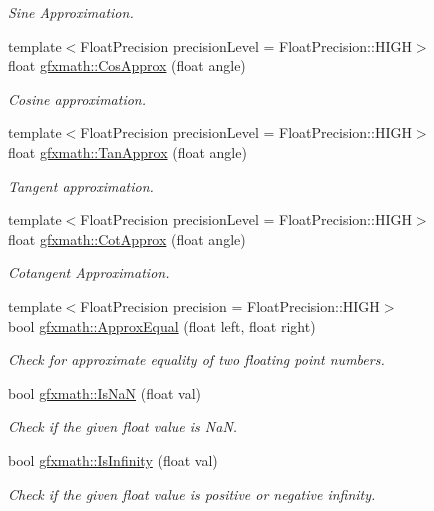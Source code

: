 \begin{DoxyCompactItemize}
\begin{DoxyCompactList}\small\item\em Sine Approximation. \end{DoxyCompactList}\item 
{\footnotesize template$<$Float\+Precision precision\+Level = Float\+Precision\+::\+H\+I\+G\+H$>$ }\\float \hyperlink{group___s_i_s_d_scalar_math_ga4c7f22bb5c746703d834991b074e2721}{gfxmath\+::\+Cos\+Approx} (float angle)
\begin{DoxyCompactList}\small\item\em Cosine approximation. \end{DoxyCompactList}\item 
{\footnotesize template$<$Float\+Precision precision\+Level = Float\+Precision\+::\+H\+I\+G\+H$>$ }\\float \hyperlink{group___s_i_s_d_scalar_math_gac117306c04c7d0b931c3b2b4eb4fd6ae}{gfxmath\+::\+Tan\+Approx} (float angle)
\begin{DoxyCompactList}\small\item\em Tangent approximation. \end{DoxyCompactList}\item 
{\footnotesize template$<$Float\+Precision precision\+Level = Float\+Precision\+::\+H\+I\+G\+H$>$ }\\float \hyperlink{group___s_i_s_d_scalar_math_ga6914719e1538a2c1d58828197bc76041}{gfxmath\+::\+Cot\+Approx} (float angle)
\begin{DoxyCompactList}\small\item\em Cotangent Approximation. \end{DoxyCompactList}\item 
{\footnotesize template$<$Float\+Precision precision = Float\+Precision\+::\+H\+I\+G\+H$>$ }\\bool \hyperlink{group___s_i_s_d_scalar_math_ga384f6df082ace9bc432bac8fac5b6686}{gfxmath\+::\+Approx\+Equal} (float left, float right)
\begin{DoxyCompactList}\small\item\em Check for approximate equality of two floating point numbers. \end{DoxyCompactList}\item 
bool \hyperlink{group___s_i_s_d_scalar_math_ga894ca122cd6d482ed5608f3410bc2bb4}{gfxmath\+::\+Is\+Na\+N} (float val)
\begin{DoxyCompactList}\small\item\em Check if the given float value is Na\+N. \end{DoxyCompactList}\item 
bool \hyperlink{group___s_i_s_d_scalar_math_ga29ffc432e0aaaa5201bfca15247fa648}{gfxmath\+::\+Is\+Infinity} (float val)
\begin{DoxyCompactList}\small\item\em Check if the given float value is positive or negative infinity. \end{DoxyCompactList}\end{DoxyCompactItemize}


